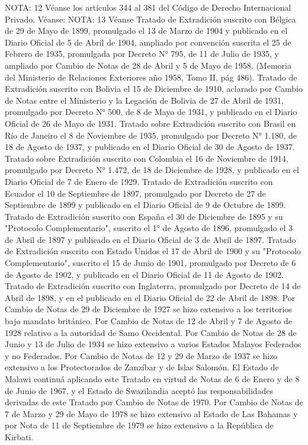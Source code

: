 NOTA:  12
    Véanse los artículos 344 al 381 del Código de Derecho Internacional Privado.
    Véanse:
NOTA:  13
    Véanse Tratado de Extradición suscrito con Bélgica de 29 de Mayo de 1899, promulgado el 13 de Marzo de 1904 y publicado en el Diario Oficial de 5 de Abril de 1904, ampliado por convención suscrita el 25 de Febrero de 1935, promulgada por Decreto N° 795, de 11 de Julio de 1935, y ampliado por Cambio de Notas de 28 de Abril y 5 de Mayo de 1958. (Memoria del Ministerio de Relaciones Exteriores año 1958, Tomo II, pág 486).
    Tratado de Extradición suscrito con Bolivia el 15 de Diciembre de 1910, aclarado por Cambio de Notas entre el Ministerio y la Legación de Bolivia de 27 de Abril de 1931, promulgado por Decreto N° 500, de 8 de Mayo de 1931, y publicado en el Diario Oficial de 26 de Mayo de 1931.
    Tratado sobre Extradición suscrito con Brasil en Río de Janeiro el 8 de Noviembre de 1935, promulgado por Decreto N° 1.180, de 18 de Agosto de 1937, y publicado en el Diario Oficial de 30 de Agosto de 1937.
    Tratado sobre Extradición suscrito con Colombia el 16 de Noviembre de 1914, promulgado por Decreto N° 1.472, de 18 de Diciembre de 1928, y publicado en el Diario Oficial de 7 de Enero de 1929.
    Tratado de Extradición suscrito con Ecuador el 10 de Septiembre de 1897, promulgado por Decreto de 27 de Septiembre de 1899 y publicado en el Diario Oficial de 9 de Octubre de 1899.
    Tratado de Extradición suscrito con España el 30 de Diciembre de 1895 y su "Protocolo Complementario", suscrito el 1° de Agosto de 1896, promulgado el 3 de Abril de 1897 y publicado en el Diario Oficial de 3 de Abril de 1897.
    Tratado de Extradición suscrito con Estado Unidos el 17 de Abril de 1900 y su "Protocolo Complementario", suscrito el 15 de Junio de 1901, promulgado por Decreto de 6 de Agosto de 1902, y publicado en el Diario Oficial de 11 de Agosto de 1902.
    Tratado de Extradición suscrito con Inglaterra, promulgado por Decreto de 14 de Abril de 1898, y en el publicado en el Diario Oficial de 22 de Abril de 1898. Por Cambio de Notas de 29 de Diciembre de 1927 se hizo extensivo a los territorios bajo mandato británico. Por Cambio de Notas de 12 de Abril y 7 de Agosto de 1928 relativo a la autoridad de Samo Occidental. Por Cambio de Notas de 28 de Junio y 13 de Julio de 1934 se hizo extensivo a varios Estados Malayos Federados y no Federados. Por Cambio de Notas de 12 y 29 de Marzo de 1937 se hizo extensivo a los Protectorados de Zanzíbar y de Islas Salomón. El Estado de Malawi continuá aplicando este Tratado en virtud de Notas de 6 de Enero y de 8 de Junio de 1967, y el Estado de Swazilandia aceptó las responsabilidades derivadas de este Tratado por Cambio de Notas de 1970. Por Cambio de Notas de 7 de Marzo y 29 de Mayo de 1978 se hizo extensivo al Estado de Las Bahamas y por Nota de 11 de Septiembre de 1979 se hizo extensivo a la República de Kirbati.
